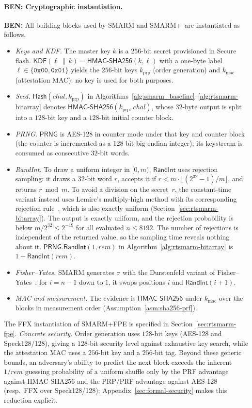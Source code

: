 \documentclass{ieeeaccess}
\DeclareRobustCommand{\ben}[1]{{\color{BENcolor}\textbf{BEN:} #1}}
\newcommand{\rtsmarm}{SMARM+\xspace}
\newcommand{\rtsmarmtwo}{SMARM+FPE\xspace}
\begin{document}
\paragraph{\ben{Cryptographic instantiation.}}
\ben{All building blocks used by SMARM and \rtsmarm\ are instantiated as follows.
\begin{itemize}
  \item \emph{Keys and KDF.} The master key $k$ is a $256$-bit secret provisioned in Secure flash.
  $\mathsf{KDF}(\ell \,\|\, k) = \mathsf{HMAC\text{-}SHA256}(k, \ell)$ with a one-byte label $\ell \in \{\texttt{0x00}, \texttt{0x01}\}$ yields the $256$-bit keys $k_{\mathrm{prp}}$ (order generation) and $k_{\mathrm{mac}}$ (attestation MAC); no key is used for both purposes.
  \item \emph{Seed.} $\mathsf{Hash}(chal, k_{\mathrm{prp}})$ in Algorithms~\ref{alg:smarm_baseline}--\ref{alg:rtsmarm-bitarray} denotes $\mathsf{HMAC\text{-}SHA256}(k_{\mathrm{prp}}, chal)$, whose $32$-byte output is split into a $128$-bit key and a $128$-bit initial counter block.
  \item \emph{PRNG.} $\mathsf{PRNG}$ is AES-128 in counter mode under that key and counter block (the counter is incremented as a $128$-bit big-endian integer); its keystream is consumed as consecutive $32$-bit words.
  \item \emph{RandInt.} To draw a uniform integer in $[0, m)$, $\mathsf{RandInt}$ uses rejection sampling: it draws a $32$-bit word $r$, accepts it if $r < m \cdot \lfloor (2^{32}-1)/m \rfloor$, and returns $r \bmod m$. To avoid a division on the secret~$r$, the constant-time variant instead uses Lemire's multiply-high method with its corresponding rejection rule~\cite{lemire2019fast}, which is also exactly uniform (Section~\ref{sec:rtsmarm-bitarray}).
  The output is exactly uniform, and the rejection probability is below $m/2^{32} \le 2^{-19}$ for all evaluated $n \le 8192$.
  The number of rejections is independent of the returned value, so the sampling time reveals nothing about it.
  $\mathsf{PRNG.RandInt}(1, rem)$ in Algorithm~\ref{alg:rtsmarm-bitarray} is $1 + \mathsf{RandInt}(rem)$.
  \item \emph{Fisher--Yates.} SMARM generates $\sigma$ with the Durstenfeld variant of Fisher--Yates~\cite{fisherYates}: for $i = n-1$ down to $1$, it swaps positions $i$ and $\mathsf{RandInt}(i+1)$.
  \item \emph{MAC and measurement.} The evidence is $\mathsf{HMAC\text{-}SHA256}$ under $k_{\mathrm{mac}}$ over the blocks in measurement order (Assumption~\ref{asm:sha256-prf}).
\end{itemize}
The FFX instantiation of \rtsmarmtwo is specified in Section~\ref{sec:rtsmarm-fpe}.
\emph{Concrete security.} Order generation uses $128$-bit keys (AES-128 and Speck128/128), giving a $128$-bit security level against exhaustive key search, while the attestation MAC uses a $256$-bit key and a $256$-bit tag.
Beyond these generic bounds, an adversary's ability to predict the next block exceeds the inherent $1/rem$ guessing probability of a uniform shuffle only by the PRF advantage against HMAC-SHA256 and the PRP/PRF advantage against AES-128 (resp.\ FFX over Speck128/128); Appendix~\ref{sec:formal-security} makes this reduction explicit.}
\end{document}
